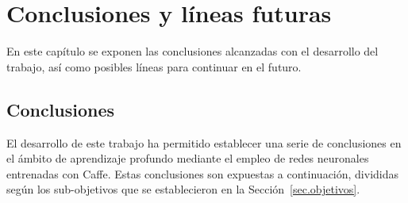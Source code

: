 \chapter{Conclusiones y líneas futuras}\label{cap.conclusiones}
En este capítulo se exponen las conclusiones alcanzadas con el desarrollo del trabajo, así como posibles líneas para continuar en el futuro.

\section{Conclusiones}
El desarrollo de este trabajo ha permitido establecer una serie de conclusiones en el ámbito de aprendizaje profundo mediante el empleo de redes neuronales entrenadas con Caffe. Estas conclusiones son expuestas a continuación, divididas según los sub-objetivos que se establecieron en la Sección~\ref{sec.objetivos}.
